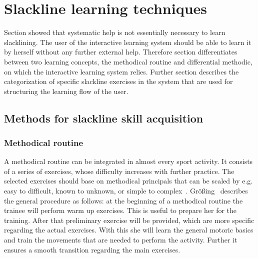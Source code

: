 \section{Slackline learning techniques}\label{3_3_learningTechniques}
Section \textit{} showed that systematic help is not essentially necessary to learn slacklining. The user of the interactive learning system should be able to learn it by herself without any further external help. Therefore section \textit{} differentiates between two learning concepts, the methodical routine and differential methodic, on which the interactive learning system relies.
Further section \textit{} describes the categorization of specific slackline exercises in the system that are used for structuring the learning flow of the user.

\subsection{Methods for slackline skill acquisition}\label{3_3_1_learningConcepts}
\subsubsection{Methodical routine}
A methodical routine can be integrated in almost every sport activity. It consists of a series of exercises, whose difficulty increases with further practice. The selected exercises should base on methodical principals that can be scaled by e.g. easy to difficult, known to unknown, or simple to complex~\cite{Fetz1996-ml}. Größing~\cite{Groessing1997-sp} describes the general procedure as follows: at the beginning of a methodical routine the trainee will perform warm up exercises. This is useful to prepare her for the training. After that preliminary exercise will be provided, which are more specific regarding the actual exercises. With this she will learn the general motoric basics and train the movements that are needed to perform the activity. Further it ensures a smooth transition regarding the main exercises.


